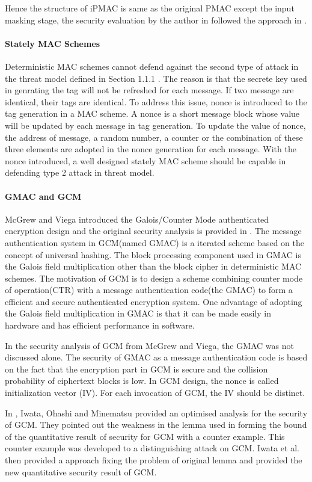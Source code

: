 \documentclass{article}
\begin{document}
Hence the structure of iPMAC is same as the original PMAC except the input masking stage, the security evaluation by the author in \cite{iPMAC} followed the approach in \cite{pmac}.

\paragraph{Stately MAC Schemes}
Deterministic MAC schemes cannot defend against the second type of attack in the threat model defined in Section 1.1.1 . The reason is that the secrete key used in genrating the tag will not be refreshed for each message. If two message are identical, their tags are identical. To address this issue, nonce is introduced to the tag generation in a MAC scheme. A nonce is a short message block whose value will be updated by each message in tag generation. To update the value of nonce, the address of message, a random number, a counter or the combination of these three elements are adopted in the nonce generation for each message. With the nonce introduced, a well designed stately MAC scheme should be capable in defending type 2 attack in threat model.
\paragraph{GMAC and GCM}
McGrew and Viega introduced the Galois/Counter Mode authenticated encryption design and the original security analysis is provided in \cite{gcm}. The message authentication system in GCM(named GMAC) is a iterated scheme based on the concept of universal hashing. The block processing component used in GMAC is the Galois field multiplication other than the block cipher in deterministic MAC schemes. 
The motivation of GCM is to design a scheme combining counter mode of operation(CTR) with a message authentication code(the GMAC) to form a efficient and secure authenticated encryption system.
One advantage of adopting the Galois field multiplication in GMAC is that it can be made easily in hardware and has efficient performance in software. 

In the security analysis of GCM from McGrew and Viega, the GMAC was not discussed alone. The security of GMAC as a message authentication code is based on the fact that the encryption part in GCM is secure and the collision probability of ciphertext blocks is low. 
In GCM design, the nonce is called initialization vector (IV). For each invocation of GCM, the IV should be distinct.

In \cite{breaking}, Iwata, Ohashi and Minematsu provided an optimised analysis for the security of GCM. They pointed out the weakness in the lemma used in forming the bound of the quantitative result of security for GCM with a counter example. This counter example was developed to a distinguishing attack on GCM. Iwata et al. then provided a approach fixing the problem of original lemma and provided the new quantitative security result of GCM. 
\end{document}
